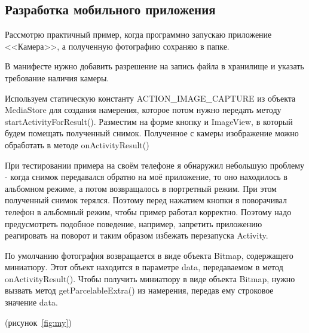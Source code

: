 \subsection{Разработка мобильного приложения}

Рассмотрю практичный пример, когда программно запускаю приложение <<Камера>>, а полученную фотографию сохраняю в папке.~\cite{camera}

В манифесте нужно добавить разрешение на запись файла в хранилище и указать требование наличия камеры.

Используем статическую константу ACTION\_IMAGE\_CAPTURE из объекта MediaStore для создания намерения, которое потом нужно передать методу startActivityForResult(). Разместим на форме кнопку и ImageView, в который будем помещать полученный снимок. Полученное с камеры изображение можно обработать в методе onActivityResult()

При тестировании примера на своём телефоне я обнаружил небольшую проблему - когда снимок передавался обратно на моё приложение, то оно находилось в альбомном режиме, а потом возвращалось в портретный режим. При этом полученный снимок терялся. Поэтому перед нажатием кнопки я поворачивал телефон в альбомный режим, чтобы пример работал корректно. Поэтому надо предусмотреть подобное поведение, например, запретить приложению реагировать на поворот и таким образом избежать перезапуска Activity. 

По умолчанию фотография возвращается в виде объекта Bitmap, содержащего миниатюру. Этот объект находится в параметре data, передаваемом в метод onActivityResult(). Чтобы получить миниатюру в виде объекта Bitmap, нужно вызвать метод getParcelableExtra() из намерения, передав ему строковое значение data.

(рисунок~\ref{fig:my})


